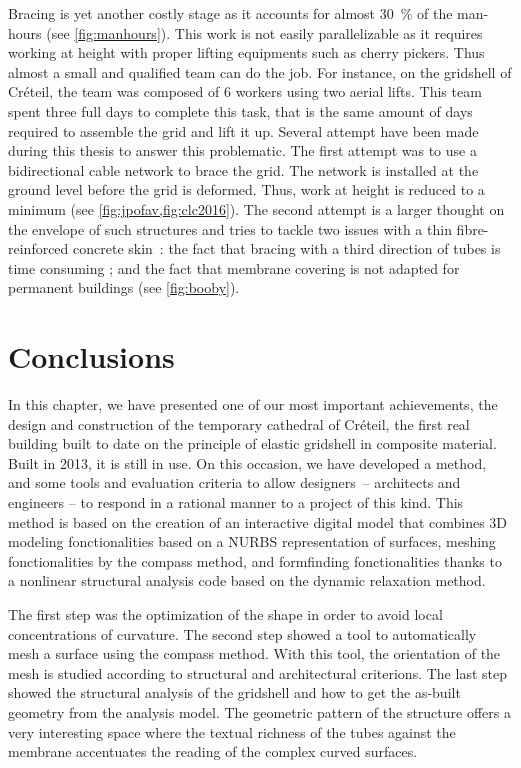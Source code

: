 Bracing is yet another costly stage as it accounts for almost 30~\% of the man-hours (see \cref{fig:manhours}). This work is not easily parallelizable as it requires working at height with proper lifting equipments such as cherry pickers. Thus almost a small and qualified team can do the job. For instance, on the gridshell of Créteil, the team was composed of 6 workers using two aerial lifts. This team spent three full days to complete this task, that is the same amount of days required to assemble the grid and lift it up. Several attempt have been made during this thesis to answer this problematic. The first attempt was to use a bidirectional cable network to brace the grid. The network is installed at the ground level before the grid is deformed. Thus, work at height is reduced to a minimum (see \cref{fig:jpofav,fig:clc2016}). The second attempt is a larger thought on the envelope of such structures and tries to tackle two issues with a thin fibre-reinforced concrete skin~: the fact that bracing with a third direction of tubes is time consuming ; and the fact that membrane covering is not adapted for permanent buildings \cite{Cuvilliers2017} (see \cref{fig:booby}).



\section{Conclusions}

In this chapter, we have presented one of our most important achievements, the design and construction of the temporary cathedral of Créteil, the first real building built to date on the principle of elastic gridshell in composite material. Built in 2013, it is still in use. On this occasion, we have developed a method, and some tools and evaluation criteria to allow designers~-- architects and engineers -- to respond in a rational manner to a project of this kind. This method is based on the creation of an interactive digital model that combines 3D modeling fonctionalities based on a NURBS representation of surfaces, meshing fonctionalities by the compass method, and formfinding fonctionalities thanks to a nonlinear structural analysis code based on the dynamic relaxation method.

The first step was the optimization of the shape in order to avoid local concentrations of curvature. The second step showed a tool to automatically mesh a surface using the compass method. With this tool, the orientation of the mesh is studied according to structural and architectural criterions. The last step showed the structural analysis of the gridshell and how to get the as-built geometry from the analysis model. The geometric pattern of the structure offers a very interesting space where the textual richness of the tubes against the membrane accentuates the reading of the complex curved surfaces.


